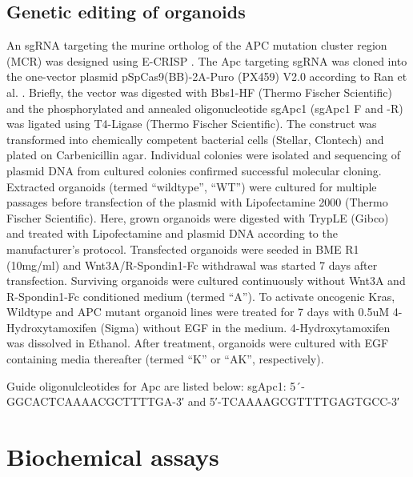 \begin{flushleft}
\subsection{Genetic editing of organoids}
An sgRNA targeting the murine ortholog of the APC mutation cluster region (MCR) was designed using E-CRISP \cite{Heigwer2014-gq}. The Apc targeting sgRNA was cloned into the one-vector plasmid pSpCas9(BB)-2A-Puro (PX459) V2.0 according to Ran et al. \cite{Ran2013-ca}. Briefly, the vector was digested with Bbs1-HF (Thermo Fischer Scientific) and the phosphorylated and annealed oligonucleotide sgApc1 (sgApc1 F and -R) was ligated using T4-Ligase (Thermo Fischer Scientific). The construct was transformed into chemically competent bacterial cells (Stellar, Clontech) and plated on Carbenicillin agar. Individual colonies were isolated and sequencing of plasmid DNA from cultured colonies confirmed successful molecular cloning.   
Extracted organoids (termed “wildtype”, “WT”) were cultured for multiple passages before transfection of the plasmid with Lipofectamine 2000 (Thermo Fischer Scientific). Here, grown organoids were digested with TrypLE (Gibco) and treated with Lipofectamine and plasmid DNA according to the manufacturer’s protocol. Transfected organoids were seeded in BME R1 (10mg/ml) and Wnt3A/R-Spondin1-Fc withdrawal was started 7 days after transfection. Surviving organoids were cultured continuously without Wnt3A and R-Spondin1-Fc conditioned medium (termed “A”).
To activate oncogenic Kras, Wildtype and APC mutant organoid lines were treated for 7 days with 0.5uM 4-Hydroxytamoxifen (Sigma) without EGF in the medium. 4-Hydroxytamoxifen was dissolved in Ethanol. After treatment, organoids were cultured with EGF containing media thereafter (termed “K” or “AK”, respectively).

\smallbreak
Guide oligonulcleotides for Apc are listed below:
sgApc1: 5´-GGCACTCAAAACGCTTTTGA-3′ and 5′-TCAAAAGCGTTTTGAGTGCC-3′ 

\section{Biochemical assays}


\end{flushleft}
